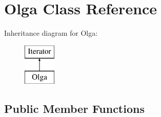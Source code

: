 \hypertarget{classOlga}{}\section{Olga Class Reference}
\label{classOlga}
Inheritance diagram for Olga\+:\begin{figure}[H]
\begin{center}
\leavevmode
\includegraphics[height=2.000000cm]{classOlga}
\end{center}
\end{figure}
\subsection*{Public Member Functions}
